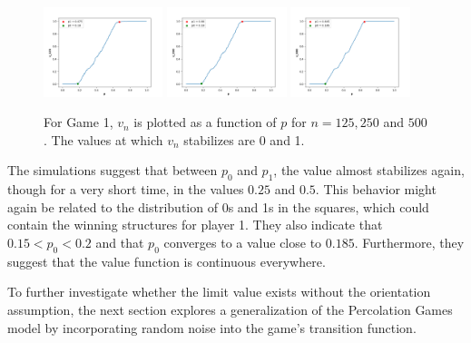         \begin{figure}[!hbt]
            \centering
            \includegraphics[width = 0.31\textwidth]{../images/game1/0pN125MAXITER30EPS0.01.png}        
            \includegraphics[width = 0.31\textwidth]{../images/game1/0pN250MAXITER30EPS0.01.png}        
            \includegraphics[width = 0.31\textwidth]{../images/game1/0pN500MAXITER30EPS0.01.png}
            \caption{For Game 1, $v_{n}$ is plotted as a function of $p$ for $n = 125, 250$ and $500$. The values at which $v_{n}$ stabilizes are 0 and 1.} 
            \label{figurepNgame1}
        \end{figure} 

        The simulations suggest that between $p_0$ and $p_1$, the value almost stabilizes again, though for a very short time, in the values $0.25$ and $0.5$. This behavior might again be related to the distribution of 0s and 1s in the squares, which could contain the winning structures for player 1. They also indicate that $0.15 < p_0 < 0.2$ and that $p_0$ converges to a value close to $0.185$. Furthermore, they suggest that the value function is continuous everywhere.

        To further investigate whether the limit value exists without the orientation assumption, the next section explores a generalization of the Percolation Games model by incorporating random noise into the game's transition function.
